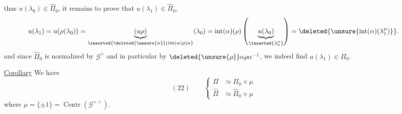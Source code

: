 thus $u(\lambda_0)\in\widehat{\Pi}_0$, it remains to prove that
$u(\lambda_1)\in\widehat{\Pi}_0$, 
\[
u(\lambda_1)
=u(\rho(\lambda_0))
=\underbrace{(u\rho)}_{\inserted{\deleted{\unsure{u}}(\operatorname{int}(\alpha)\rho)u}}(\lambda_0)
=\operatorname{int}(\alpha)(\rho)
\left(\underbrace{u(\lambda_0)}_{\inserted{\lambda_0^\mu}}\right)
=\deleted{\unsure{\operatorname{int}(\alpha)(\lambda_1^\mu)}}.
\]
and since $\widehat{\Pi}_0$ is normalized by $\mathcal G^\wedge$
and in particular by $\deleted{\unsure{\rho}}\alpha\rho\alpha^{-1}$,
we indeed find $u(\lambda_1)\in\Pi_0$.

\uline{Corollary} We have
\[
(22)\qquad
\left\{
\begin{aligned}
\Pi&\simeq\Pi_0\times\mu\\
\widehat{\Pi}&\simeq\widehat{\Pi}_0\times\mu
\end{aligned}
\right.
\]
where $\mu=\{\pm1\}=\operatorname{Centr}(\mathcal G^{+\wedge})$.





